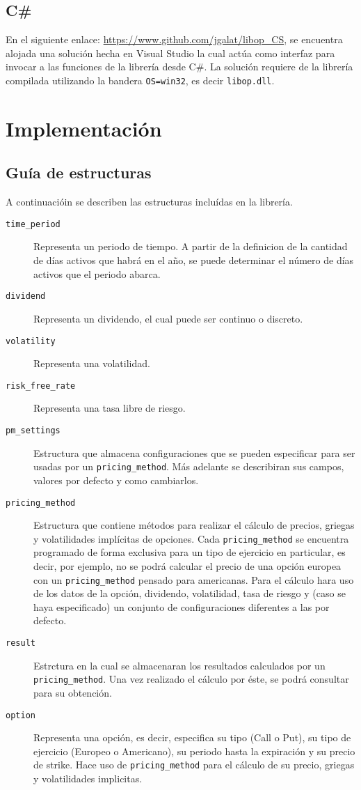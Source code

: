 \documentclass[12pt,a4paper,final]{article}
\begin{document}
	\subsection{C\#}
		En el siguiente enlace: \url{https://www.github.com/jgalat/libop_CS}, se encuentra alojada
		una solución hecha en Visual Studio la cual actúa como interfaz para invocar a las funciones
		de la librería desde C\#. La solución requiere de la librería compilada utilizando la bandera
		\texttt{OS=win32}, es decir \texttt{libop.dll}.
		
\section{Implementación}

	\subsection{Guía de estructuras}
		A continuacióin se describen las estructuras incluídas en la librería.
		
		\begin{description}
		\item [\texttt{time\_period}] Representa un periodo de tiempo. A partir de la definicion de 
			la cantidad de días activos que habrá en el año, se puede determinar el número
			de días activos que el periodo abarca.  
		\item [\texttt{dividend}] Representa un dividendo, el cual puede ser continuo o discreto.
		\item [\texttt{volatility}] Representa una volatilidad.
		\item [\texttt{risk\_free\_rate}] Representa una tasa libre de riesgo.
		\item [\texttt{pm\_settings}] Estructura que almacena configuraciones que se pueden
			especificar para ser usadas por un \texttt{pricing\_method}. Más adelante se describiran
			sus campos, valores por defecto y como cambiarlos.
		\item [\texttt{pricing\_method}] Estructura que contiene métodos para realizar el cálculo
			de precios, griegas y volatilidades implícitas de opciones. Cada \texttt{pricing\_method}
			se encuentra programado de forma exclusiva para un tipo de ejercicio en particular,
			es decir, por ejemplo, no se podrá calcular el precio de una opción europea con un
			\texttt{pricing\_method} pensado para americanas. Para el cálculo hara uso de los datos
			de la opción, dividendo, volatilidad, tasa de riesgo y (caso se haya especificado) un conjunto
			de configuraciones diferentes a las por defecto.
		\item [\texttt{result}]	Estrctura en la cual se almacenaran los resultados calculados por
			un \texttt{pricing\_method}. Una vez realizado el cálculo por éste, se podrá consultar para
			su obtención.
		\item [\texttt{option}] Representa una opción, es decir, especifica su tipo (Call o Put), su
			tipo de ejercicio (Europeo o Americano), su periodo hasta la expiración y su precio de
			strike. Hace uso de \texttt{pricing\_method} para el cálculo de su precio, griegas y
			volatilidades implicitas.
		\end{description}
\end{document}
